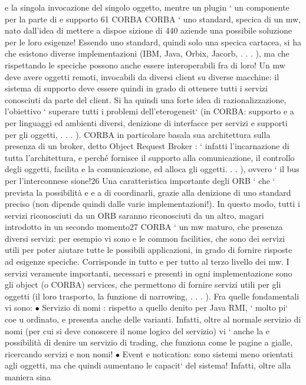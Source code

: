 \documentclass[a4paper,12pt]{article}
\begin{document}
e
la singola invocazione del singolo oggetto, mentre un plugin ` un componente per la parte di
e
supporto
61
CORBA
CORBA ` uno standard, specica di un mw, nato dall'idea di mettere a dispoe
sizione di 440 aziende una possibile soluzione per le loro esigenze!
Essendo uno standard, quindi solo una specica cartacea, si ha che esistono
diverse implementazioni (IBM, Java, Orbix, Jacorb, . . . ), ma che rispettando le
speciche possono anche essere interoperabili fra di loro!
Un mw deve avere oggetti remoti, invocabili da diversi client su diverse macchine: il sistema di supporto deve essere
quindi in grado di ottenere tutti i servizi
conosciuti da parte del client. Si ha quindi una forte idea di razionalizzazione,
l'obiettivo ` superare tutti i problemi dell'eterogeneit` (in CORBA: supporto
e
a
per linguaggi ed ambienti diversi, denizione di interfacce per servizi e supporti
per gli oggetti, . . . ).
CORBA in particolare basala sua architettura sulla presenza di un broker,
detto Object Request Broker : ` infatti l'incarnazione di tutta l'architettura,
e
perché fornisce il supporto alla comunicazione, il controllo degli oggetti, facilita
e
la comunicazione, ed alloca gli oggetti. . . ), ovvero ` il bus per l'interconnese
sione!26 Una caratteristica importante degli ORB ` che ` prevista la possibilità
e
e
a
di coordinarli, grazie alla denizione di uno standard preciso (non dipende quindi dalle varie implementazioni!). In
questo modo, tutti i servizi riconosciuti da
un ORB saranno riconosciuti da un altro, magari introdotto in un secondo
momento27
CORBA ` un mw maturo, che presenza diversi servizi: per esempio vi sono
e
le common facilities, che sono dei servizi utili per poter aiutare tutte le possibili
applicazioni, in grado di fornire risposte ad esigenze speciche. Corrisponde in
tutto e per tutto al terzo livello dei mw.
I servizi veramente importanti, necessari e presenti in ogni implementazione
sono gli object (o CORBA) services, che permettono di fornire servizi utili per gli
oggetti (il loro trasporto, la funzione di narrowing, . . . ). Fra quelle fondamentali
vi sono:
$\bullet$ Servizio di nomi : rispetto a quello denito per Java RMI, ` molto pi` coe
u
ordinato, e presenta anche delle varianti. Infatti, oltre al normale servizio
di nomi (per cui si deve conoscere il nome logico del servizio) vi ` anche la
e
possibilità di denire un servizio di trading, che funziona come le pagine
a
gialle, ricercando servizi e non nomi!
$\bullet$ Event e notication: sono sistemi meno orientati agli oggetti, ma che
quindi aumentano le capacit` del sistema! Infatti, oltre alla maniera sina
\end{document}
